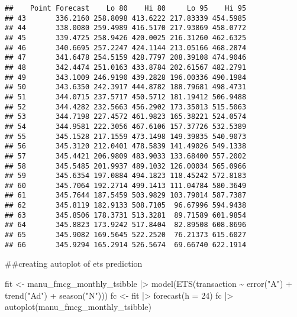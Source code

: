 \documentclass[
]{article}
\newenvironment{Shaded}{\begin{snugshade}}{\end{snugshade}}
\newcommand{\AttributeTok}[1]{\textcolor[rgb]{0.77,0.63,0.00}{#1}}
\newcommand{\DecValTok}[1]{\textcolor[rgb]{0.00,0.00,0.81}{#1}}
\newcommand{\FunctionTok}[1]{\textcolor[rgb]{0.00,0.00,0.00}{#1}}
\newcommand{\NormalTok}[1]{#1}
\newcommand{\OtherTok}[1]{\textcolor[rgb]{0.56,0.35,0.01}{#1}}
\newcommand{\SpecialCharTok}[1]{\textcolor[rgb]{0.00,0.00,0.00}{#1}}
\newcommand{\StringTok}[1]{\textcolor[rgb]{0.31,0.60,0.02}{#1}}
\begin{document}
\begin{verbatim}
##    Point Forecast    Lo 80    Hi 80     Lo 95    Hi 95
## 43       336.2160 258.8098 413.6222 217.83339 454.5985
## 44       338.0080 259.4989 416.5170 217.93869 458.0772
## 45       339.4725 258.9426 420.0025 216.31260 462.6325
## 46       340.6695 257.2247 424.1144 213.05166 468.2874
## 47       341.6478 254.5159 428.7797 208.39108 474.9046
## 48       342.4474 251.0163 433.8784 202.61567 482.2791
## 49       343.1009 246.9190 439.2828 196.00336 490.1984
## 50       343.6350 242.3917 444.8782 188.79681 498.4731
## 51       344.0715 237.5717 450.5712 181.19412 506.9488
## 52       344.4282 232.5663 456.2902 173.35013 515.5063
## 53       344.7198 227.4572 461.9823 165.38221 524.0574
## 54       344.9581 222.3056 467.6106 157.37726 532.5389
## 55       345.1528 217.1559 473.1498 149.39835 540.9073
## 56       345.3120 212.0401 478.5839 141.49026 549.1338
## 57       345.4421 206.9809 483.9033 133.68400 557.2002
## 58       345.5485 201.9937 489.1032 126.00034 565.0966
## 59       345.6354 197.0884 494.1823 118.45242 572.8183
## 60       345.7064 192.2714 499.1413 111.04784 580.3649
## 61       345.7644 187.5459 503.9829 103.79014 587.7387
## 62       345.8119 182.9133 508.7105  96.67996 594.9438
## 63       345.8506 178.3731 513.3281  89.71589 601.9854
## 64       345.8823 173.9242 517.8404  82.89508 608.8696
## 65       345.9082 169.5645 522.2520  76.21373 615.6027
## 66       345.9294 165.2914 526.5674  69.66740 622.1914
\end{verbatim}

\#\#creating autoplot of ets prediction

\begin{Shaded}
\begin{Highlighting}[]
\NormalTok{fit }\OtherTok{\textless{}{-}}\NormalTok{ manu\_fmcg\_monthly\_tsibble }\SpecialCharTok{|\textgreater{}}
      \FunctionTok{model}\NormalTok{(}\FunctionTok{ETS}\NormalTok{(transaction }\SpecialCharTok{\textasciitilde{}} \FunctionTok{error}\NormalTok{(}\StringTok{"A"}\NormalTok{) }\SpecialCharTok{+} \FunctionTok{trend}\NormalTok{(}\StringTok{"Ad"}\NormalTok{) }\SpecialCharTok{+} \FunctionTok{season}\NormalTok{(}\StringTok{"N"}\NormalTok{)))}
\NormalTok{fc }\OtherTok{\textless{}{-}}\NormalTok{ fit }\SpecialCharTok{|\textgreater{}}
      \FunctionTok{forecast}\NormalTok{(}\AttributeTok{h =} \DecValTok{24}\NormalTok{)}
\NormalTok{fc }\SpecialCharTok{|\textgreater{}}
  \FunctionTok{autoplot}\NormalTok{(manu\_fmcg\_monthly\_tsibble)}
\end{Highlighting}
\end{Shaded}
\end{document}
